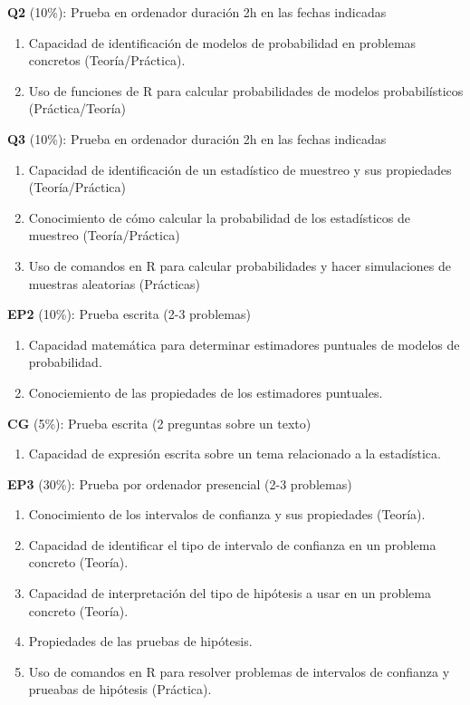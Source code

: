 \documentclass[
]{book}
\providecommand{\tightlist}{%
  \setlength{\itemsep}{0pt}\setlength{\parskip}{0pt}}
\begin{document}
\textbf{Q2} (10\%): Prueba en ordenador duración 2h en las fechas indicadas

\begin{enumerate}
\def\labelenumi{\alph{enumi}.}
\tightlist
\item
  Capacidad de identificación de modelos de probabilidad en problemas concretos (Teoría/Práctica).
\item
  Uso de funciones de R para calcular probabilidades de modelos probabilísticos (Práctica/Teoría)
\end{enumerate}

\textbf{Q3} (10\%): Prueba en ordenador duración 2h en las fechas indicadas

\begin{enumerate}
\def\labelenumi{\alph{enumi}.}
\tightlist
\item
  Capacidad de identificación de un estadístico de muestreo y sus propiedades (Teoría/Práctica)
\item
  Conocimiento de cómo calcular la probabilidad de los estadísticos de muestreo (Teoría/Práctica)
\item
  Uso de comandos en R para calcular probabilidades y hacer simulaciones de muestras aleatorias (Prácticas)
\end{enumerate}

\textbf{EP2} (10\%): Prueba escrita (2-3 problemas)

\begin{enumerate}
\def\labelenumi{\alph{enumi}.}
\tightlist
\item
  Capacidad matemática para determinar estimadores puntuales de modelos de probabilidad.
\item
  Conociemiento de las propiedades de los estimadores puntuales.
\end{enumerate}

\textbf{CG} (5\%): Prueba escrita (2 preguntas sobre un texto)

\begin{enumerate}
\def\labelenumi{\alph{enumi}.}
\tightlist
\item
  Capacidad de expresión escrita sobre un tema relacionado a la estadística.
\end{enumerate}

\textbf{EP3} (30\%): Prueba por ordenador presencial (2-3 problemas)

\begin{enumerate}
\def\labelenumi{\alph{enumi}.}
\tightlist
\item
  Conocimiento de los intervalos de confianza y sus propiedades (Teoría).
\item
  Capacidad de identificar el tipo de intervalo de confianza en un problema concreto (Teoría).
\item
  Capacidad de interpretación del tipo
  de hipótesis a usar en un problema concreto (Teoría).
\item
  Propiedades de las pruebas de hipótesis.
\item
  Uso de comandos en R para resolver problemas de intervalos de confianza y prueabas de hipótesis (Práctica).
\end{enumerate}
\end{document}
